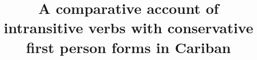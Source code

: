 \title{A comparative account of intransitive verbs with conservative first person forms in Cariban}
\date{}


%

%

%

%
%
%
%
%
%
%
%
%
%
%
%
%
%
%
%
%
%
%


